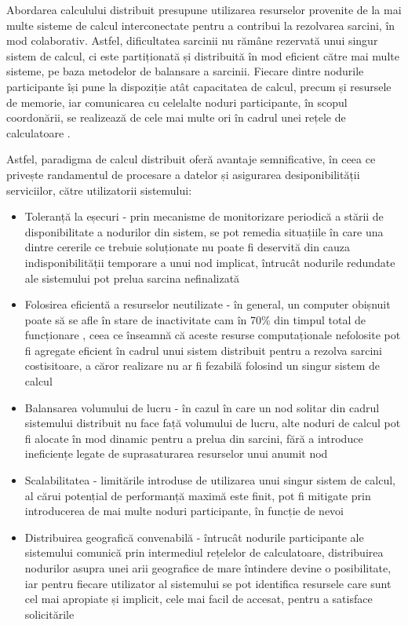 Abordarea calculului distribuit presupune utilizarea resurselor provenite de la mai multe sisteme
de calcul interconectate pentru a contribui la rezolvarea sarcini, în mod colaborativ. Astfel, dificultatea
sarcinii nu rămâne rezervată unui singur sistem de calcul, ci este partiționată și distribuită în mod eficient
către mai multe sisteme, pe baza metodelor de balansare a sarcinii. Fiecare dintre nodurile participante își
pune la dispoziție atât capacitatea de calcul, precum și resursele de memorie, iar comunicarea cu celelalte
noduri participante, în scopul coordonării, se realizează de cele mai multe ori în cadrul unei rețele 
de calculatoare \cite{buyya1999high}.

Astfel, paradigma de calcul distribuit oferă avantaje semnificative, în ceea ce privește randamentul de procesare
a datelor și asigurarea desiponibilității serviciilor, către utilizatorii sistemului:

\begin{itemize}
    \item Toleranță la eșecuri - prin mecanisme de monitorizare periodică a stării de 
    disponibilitate a nodurilor din sistem, se pot remedia situațiile în care una dintre cererile
    ce trebuie soluționate nu poate fi deservită din cauza indisponibilității temporare a unui nod implicat,
    întrucât nodurile redundate ale sistemului pot prelua sarcina nefinalizată
    \item Folosirea eficientă a resurselor neutilizate - în general, un computer obișnuit poate să se afle în stare de 
    inactivitate cam în 70\% din timpul total de funcționare \cite{buyya1999high}, ceea ce înseamnă că aceste
    resurse computaționale nefolosite pot fi agregate eficient în cadrul unui sistem distribuit pentru a rezolva
    sarcini costisitoare, a căror realizare nu ar fi fezabilă folosind un singur sistem de calcul
    \item Balansarea volumului de lucru - în cazul în care un nod solitar din cadrul sistemului distribuit nu face 
    față volumului de lucru, alte noduri de calcul pot fi alocate în mod dinamic pentru a prelua
    din sarcini, fără a introduce ineficiențe legate de suprasaturarea resurselor unui anumit nod
    \item Scalabilitatea - limitările introduse de utilizarea unui singur sistem de calcul, al cărui potențial
    de performanță maximă este finit, pot fi mitigate prin introducerea de mai multe noduri participante, în funcție de
    nevoi 
    \item Distribuirea geografică convenabilă - întrucât nodurile participante ale sistemului comunică prin intermediul
    rețelelor de calculatoare, distribuirea nodurilor asupra unei arii geografice de mare întindere devine o posibilitate,
    iar pentru fiecare utilizator al sistemului se pot identifica resursele care sunt cel mai apropiate și implicit, cele
    mai facil de accesat, pentru a satisface solicitările
\end{itemize}

